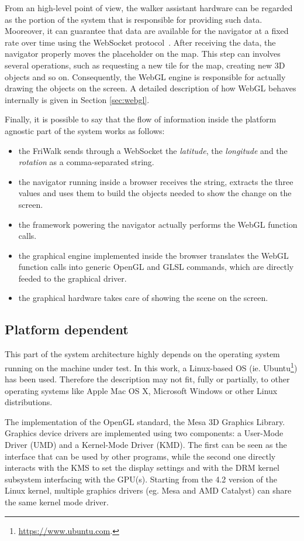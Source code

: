 From an high-level point of view, the walker assistant hardware can be regarded
as the portion of the system that is responsible for providing such data. Mooreover,
it can guarantee that data are available for the navigator at a fixed rate over
time using the WebSocket protocol~\cite{fette2011websocket}.
After receiving the data, the navigator properly moves the placeholder on the map.
This step can involves several operations, such as requesting a new tile for the
map, creating new 3D objects and so on. Consequently, the WebGL engine is responsible
for actually drawing the objects on the screen. A detailed description of how WebGL
behaves internally is given in Section \ref{sec:webgl}.

Finally, it is possible to say that the flow of information inside the platform
agnostic part of the system works as follows:
\begin{itemize}
    \item the FriWalk sends through a WebSocket the \emph{latitude}, the
        \emph{longitude} and the \emph{rotation} as a comma-separated string.
    \item the navigator running inside a browser receives the string, extracts
        the three values and uses them to build the objects needed to show the
        change on the screen.
    \item the framework powering the navigator actually performs the
        WebGL function calls.
    \item the graphical engine implemented inside the browser translates the WebGL
        function calls into generic OpenGL and GLSL commands, which are directly
        feeded to the graphical driver.
    \item the graphical hardware takes care of showing the scene on the screen.
\end{itemize}


\subsection{Platform dependent} \label{sec:platform_dependent}
This part of the system architecture highly depends on the operating system
running on the machine under test. In this work, a Linux-based OS (ie.
Ubuntu\footnote{\url{https://www.ubuntu.com}.})
has been used. Therefore the description may not fit, fully or partially, to
other operating systems like Apple Mac OS X, Microsoft Windows or other Linux
distributions.

The implementation of the OpenGL standard, the Mesa 3D Graphics Library. 
Graphics device drivers are implemented using two components: a User-Mode Driver
(UMD) and a Kernel-Mode Driver (KMD). The first can be seen as the interface
that can be used by other programs, while the second one directly interacts
with the KMS to set the display settings and with the DRM kernel subsystem
interfacing with the GPU(s). Starting from the 4.2 version of the Linux kernel,
multiple graphics drivers (eg. Mesa and AMD Catalyst) can share the same kernel
mode driver.


